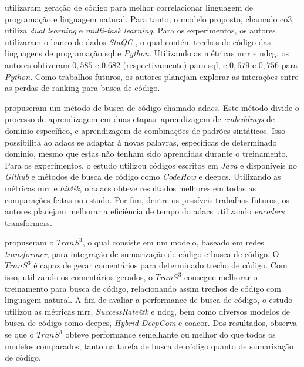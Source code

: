 \textcite{Ye2020LeveragingCG} utilizaram geração de código para melhor correlacionar linguagem de programação e linguagem natural. Para tanto, o modelo proposto, chamado \gls{co3}, utiliza \textit{dual
learning} e \textit{multi-task learning}. Para os experimentos, os autores utilizaram o banco de dados \textit{StaQC} \cite{Yao2018StaQCAS}, o qual contém trechos de código das linguagens de programação \gls{sql} e \textit{Python}. Utilizando as métricas \gls{mrr} e \gls{ndcg}, os autores obtiveram $0,585$ e $0.682$ (respectivamente) para \gls{sql}, e $0,679$ e  $0,756$ para \textit{Python}. Como trabalhos futuros, os autores planejam explorar as interações entre as perdas de ranking para busca de código.

\textcite{Ling2020AdaptiveDC} propuseram um método de busca de código chamado \gls{adacs}. Este método divide o processo de aprendizagem em duas etapas: aprendizagem de \textit{embeddings} de domínio específico, e aprendizagem de combinações de padrões sintáticos. Isso possibilita ao \gls{adacs} se adaptar à novas palavras, específicas de determinado domínio, mesmo que estas não tenham sido aprendidas durante o treinamento. Para os experimentos, o estudo utilizou códigos escritos em \textit{Java} e disponíveis no \textit{Github} e métodos de busca de código como \textit{CodeHow} e \gls{deepcs}. Utilizando as métricas \gls{mrr} e \textit{hit@k}, o \gls{adacs} obteve resultados melhores em todas as comparações feitas no estudo. Por fim, dentre os possíveis trabalhos futuros, os autores planejam melhorar a eficiência de tempo do \gls{adacs} utilizando \textit{encoders} transformers.

\textcite{Wang2020TranS3AT} propuseram o $TranS^3$, o qual consiste em um modelo, baseado em redes \textit{transformer}, para integração de sumarização de código e busca de código. O $TranS^3$ é capaz de gerar comentários para determinado trecho de código. Com isso, utilizando os comentários gerados, o $TranS^3$ consegue melhorar o treinamento para busca de código, relacionando assim trechos de código com linguagem natural. A fim de avaliar a performance de busca de código, o estudo utilizou as métricas \gls{mrr}, \textit{SuccessRate@k} e \gls{ndcg}, bem como diversos modelos de busca de código como \gls{deepcs}, \textit{Hybrid-DeepCom} e \gls{coacor}. Dos resultados, observa-se que o $TranS^3$ obteve performance semelhante ou melhor do que todos os modelos comparados, tanto na tarefa de busca de código quanto de sumarização de código.

